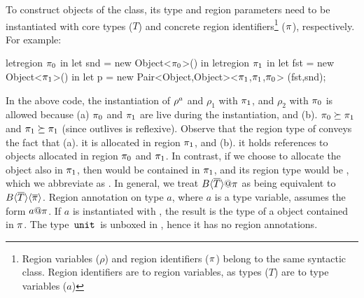 To construct objects of the  class, its type and region
parameters need to be instantiated with core types ($T$) and concrete
region identifiers\footnote{Region variables ($\rho$) and region
identifiers ($\pi$) belong to the same syntactic class. Region
identifiers are to region variables, as types ($T$) are to type
variables ($a$)} ($\pi$), respectively. For example:
\begin{codejava}
letregion $\pi_0$ in
  let snd = new Object<$\pi_0$>() in
  letregion $\pi_1$ in
    let fst = new Object<$\pi_1$>() in
    let p = new Pair<Object,Object><$\pi_1$,$\pi_1$,$\pi_0$>
                  (fst,snd);
\end{codejava}
In the above code, the instantiation of $\rho^a$ and $\rho_1$ with
$\pi_1$, and $\rho_2$ with $\pi_0$ is allowed because (a) $\pi_0$
and $\pi_1$ are live during the instantiation, and (b). $\pi_0
\succeq \pi_1$ and $\pi_1 \succeq \pi_1$ (since outlives is
reflexive). Observe that the region type of  conveys
the fact that (a). it is allocated in region $\pi_1$, and (b). it
holds references to objects allocated in region $\pi_0$ and $\pi_1$.
In contrast, if we choose to allocate the  object also in
$\pi_1$, then  would be contained in $\pi_1$, and its region
type would be , which
we abbreviate as . {In general, we treat
$B\inang{\tbar}@\rgn$ as being equivalent to
$B\langle \overline{T} \rangle\langle \overline{\pi} \rangle$}. Region annotation on type $a$, where
$a$ is a type variable, assumes the form $a@\pi$. If $a$ is
instantiated with , the result is the type of a
 object contained in  $\pi$. The type $\,{\tt unit}\,$ is unboxed in
\FB, hence it has no region annotations.

